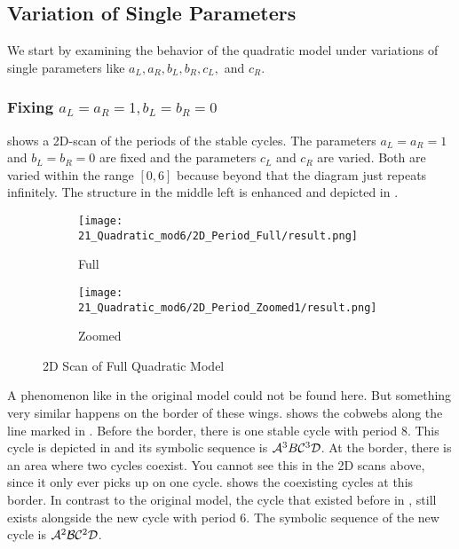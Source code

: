 \subsection{Variation of Single Parameters}

We start by examining the behavior of the quadratic model under variations of single parameters like $a_L, a_R, b_L, b_R, c_L,$ and $c_R$.

\subsubsection{Fixing $a_L = a_R = 1, b_L = b_R = 0$}

 shows a 2D-scan of the periods of the stable cycles.
The parameters $a_L = a_R = 1$ and $b_L = b_R = 0$ are fixed and the parameters $c_L$ and $c_R$ are varied.
Both are varied within the range $[0, 6]$ because beyond that the diagram just repeats infinitely.
The structure in the middle left is enhanced and depicted in .

\begin{figure}
    \centering
    \begin{subfigure}{0.4\textwidth}
        \centering
        \texttt{[image: 21\_Quadratic\_mod6/2D\_Period\_Full/result.png]}
        \caption{Full}
        \label{fig:quadratic.full.2d.full}
    \end{subfigure}
    \begin{subfigure}{0.4\textwidth}
        \centering
        \texttt{[image: 21\_Quadratic\_mod6/2D\_Period\_Zoomed1/result.png]}
        \caption{Zoomed}
        \label{fig:quadratic.full.2d.z1}
    \end{subfigure}
    \caption{2D Scan of Full Quadratic Model}
\end{figure}

A phenomenon like in the original model could not be found here.
But something very similar happens on the border of these wings.
 shows the cobwebs along the line marked in .
Before the border, there is one stable cycle with period 8.
This cycle is depicted in  and its symbolic sequence is $\mathcal{A}^3B\mathcal{C}^3\mathcal{D}$.
At the border, there is an area where two cycles coexist.
You cannot see this in the 2D scans above, since it only ever picks up on one cycle.
 shows the coexisting cycles at this border.
In contrast to the original model, the cycle that existed before in , still exists alongside the new cycle with period 6.
The symbolic sequence of the new cycle is $\mathcal{A}^2\mathcal{B}\mathcal{C}^2\mathcal{D}$.

